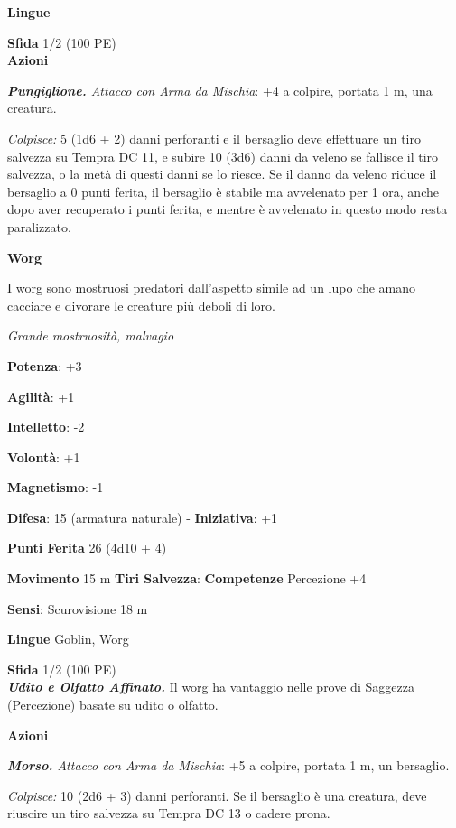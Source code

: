 \begin{multicols}{2}
\textbf{Lingue} -

\textbf{Sfida} 1/2 (100 PE)\smallskip\\

\smallskip\textbf{Azioni}

\emph{\textbf{Pungiglione.} Attacco con Arma da Mischia}: +4 a colpire,
portata 1 m, una creatura.

\emph{Colpisce:} 5 (1d6 + 2) danni perforanti e il bersaglio deve
effettuare un tiro salvezza su Tempra DC 11, e subire 10 (3d6)
danni da veleno se fallisce il tiro salvezza, o la metà di questi danni
se lo riesce. Se il danno da veleno riduce il bersaglio a 0 punti
ferita, il bersaglio è stabile ma avvelenato per 1 ora, anche dopo aver
recuperato i punti ferita, e mentre è avvelenato in questo modo resta
paralizzato.

\textbf{Worg}

I worg sono mostruosi predatori dall'aspetto simile ad un lupo che amano
cacciare e divorare le creature più deboli di loro.

\emph{Grande mostruosità, malvagio}

\textbf{Potenza}: +3

\textbf{Agilità}: +1

\textbf{Intelletto}: -2

\textbf{Volontà}: +1

\textbf{Magnetismo}: -1

\textbf{Difesa}: 15 (armatura naturale) - \textbf{Iniziativa}: +1

\textbf{Punti Ferita} 26 (4d10 + 4)

\textbf{Movimento} 15 m
\textbf{Tiri Salvezza}:
\textbf{Competenze} Percezione +4

\textbf{Sensi}: Scurovisione 18 m

\textbf{Lingue} Goblin, Worg

\textbf{Sfida} 1/2 (100 PE)\smallskip\\

\emph{\textbf{Udito e Olfatto Affinato.}} Il worg ha vantaggio nelle
prove di Saggezza (Percezione) basate su udito o olfatto.

\smallskip\textbf{Azioni}

\emph{\textbf{Morso.} Attacco con Arma da Mischia}: +5 a colpire,
portata 1 m, un bersaglio.

\emph{Colpisce:} 10 (2d6 + 3) danni perforanti. Se il bersaglio è una
creatura, deve riuscire un tiro salvezza su Tempra DC 13 o cadere prona.

\pagebreak


\end{multicols}
